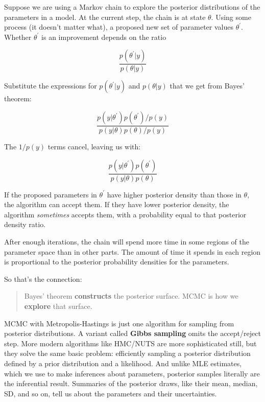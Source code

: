 \documentclass[
  13,
  letterpaper,
]{report}
\begin{document}
Suppose we are using a Markov chain to explore the posterior
distributions of the parameters in a model. At the current step, the
chain is at state \(\theta\). Using some process (it doesn't matter
what), a proposed new set of parameter values \(\theta^\prime\). Whether
\(\theta^\prime\) is an improvement depends on the ratio

\[\frac{p\left(\theta^\prime|y\right)}{p\left(\theta|y\right)}\]

Substitute the expressions for \(p\left(\theta^\prime|y\right)\) and
\(p\left(\theta|y\right)\) that we get from Bayes' theorem:

\[\frac{p\left(y|\theta^\prime\right)p\left(\theta^\prime\right)/p\left(y\right)}{p\left(y|\theta\right)p\left(\theta\right)/p\left(y\right)}\]

The \(1/p\left(y\right)\) terms cancel, leaving us with:

\[\frac{p\left(y|\theta^\prime\right)p\left(\theta^\prime\right)}{p\left(y|\theta\right)p\left(\theta\right)}\]

If the proposed parameters in \(\theta^\prime\) have higher posterior
density than those in \(\theta\), the algorithm can accept them. If they
have lower posterior density, the algorithm \emph{sometimes} accepts
them, with a probability equal to that posterior density ratio.

After enough iterations, the chain will spend more time in some regions
of the parameter space than in other parts. The amount of time it spends
in each region is proportional to the posterior probability densities
for the parameters.

So that's the connection:

\begin{quote}
Bayes' theorem \textbf{constructs} the posterior surface. MCMC is how we
\textbf{explore} that surface.
\end{quote}

MCMC with Metropolis-Hastings is just one algorithm for sampling from
posterior distributions. A variant called \textbf{Gibbs sampling} omits
the accept/reject step. More modern algorithms like HMC/NUTS are more
sophisticated still, but they solve the same basic problem: efficiently
sampling a posterior distribution defined by a prior distribution and a
likelihood. And unlike MLE estimates, which we use to make inferences
about parameters, posterior samples literally are the inferential
result. Summaries of the posterior draws, like their mean, median, SD,
and so on, tell us about the parameters and their uncertainties.
\end{document}
